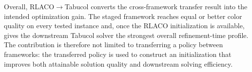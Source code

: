 Overall, RLACO$\rightarrow$Tabucol converts the cross-framework transfer result into the intended optimization gain. The staged framework reaches equal or better color quality on every tested instance and, once the RLACO initialization is available, gives the downstream Tabucol solver the strongest overall refinement-time profile. The contribution is therefore not limited to transferring a policy between frameworks: the transferred policy is used to construct an initialization that improves both attainable solution quality and downstream solving efficiency.
